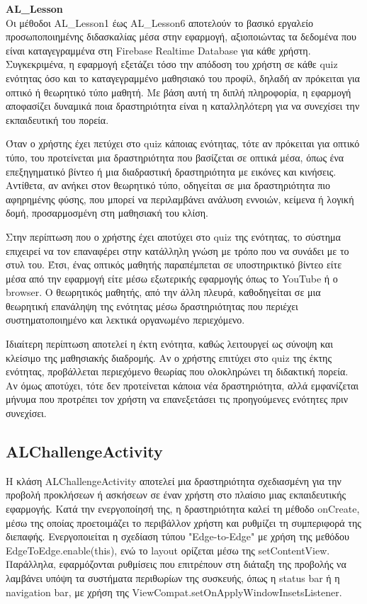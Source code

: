 \documentclass[11pt]{report}
\begin{document}
\vspace{0.3cm}
\textbf{AL\_Lesson} \\

Οι μέθοδοι AL\_Lesson1 έως AL\_Lesson6 αποτελούν το βασικό εργαλείο προσωποποιημένης διδασκαλίας μέσα στην εφαρμογή, αξιοποιώντας τα δεδομένα που είναι καταγεγραμμένα στη Firebase Realtime Database για κάθε χρήστη. Συγκεκριμένα, η εφαρμογή εξετάζει τόσο την απόδοση του χρήστη σε κάθε quiz ενότητας όσο και το καταγεγραμμένο μαθησιακό του προφίλ, δηλαδή αν πρόκειται για οπτικό ή θεωρητικό τύπο μαθητή. Με βάση αυτή τη διπλή πληροφορία, η εφαρμογή αποφασίζει δυναμικά ποια δραστηριότητα είναι η καταλληλότερη για να συνεχίσει την εκπαιδευτική του πορεία. 

Όταν ο χρήστης έχει πετύχει στο quiz κάποιας ενότητας, τότε αν πρόκειται για οπτικό τύπο, του προτείνεται μια δραστηριότητα που βασίζεται σε οπτικά μέσα, όπως ένα επεξηγηματικό βίντεο ή μια διαδραστική δραστηριότητα με εικόνες και κινήσεις. Αντίθετα, αν ανήκει στον θεωρητικό τύπο, οδηγείται σε μια δραστηριότητα πιο αφηρημένης φύσης, που μπορεί να περιλαμβάνει ανάλυση εννοιών, κείμενα ή λογική δομή, προσαρμοσμένη στη μαθησιακή του κλίση. 

Στην περίπτωση που ο χρήστης έχει αποτύχει στο quiz της ενότητας, το σύστημα επιχειρεί να τον επαναφέρει στην κατάλληλη γνώση με τρόπο που να συνάδει με το στυλ του. Έτσι, ένας οπτικός μαθητής παραπέμπεται σε υποστηρικτικό βίντεο είτε μέσα από την εφαρμογή είτε μέσω εξωτερικής εφαρμογής όπως το YouTube ή ο browser. Ο θεωρητικός μαθητής, από την άλλη πλευρά, καθοδηγείται σε μια θεωρητική επανάληψη της ενότητας μέσω δραστηριότητας που περιέχει συστηματοποιημένο και λεκτικά οργανωμένο περιεχόμενο. 

Ιδιαίτερη περίπτωση αποτελεί η έκτη ενότητα, καθώς λειτουργεί ως σύνοψη και κλείσιμο της μαθησιακής διαδρομής. Αν ο χρήστης επιτύχει στο quiz της έκτης ενότητας, προβάλλεται περιεχόμενο θεωρίας που ολοκληρώνει τη διδακτική πορεία. Αν όμως αποτύχει, τότε δεν προτείνεται κάποια νέα δραστηριότητα, αλλά εμφανίζεται μήνυμα που προτρέπει τον χρήστη να επανεξετάσει τις προηγούμενες ενότητες πριν συνεχίσει. 

\subsection{ALChallengeActivity}

Η κλάση ALChallengeActivity αποτελεί μια δραστηριότητα σχεδιασμένη για την προβολή προκλήσεων ή ασκήσεων σε έναν χρήστη στο πλαίσιο μιας εκπαιδευτικής εφαρμογής. Κατά την ενεργοποίησή της, η δραστηριότητα καλεί τη μέθοδο onCreate, μέσω της οποίας προετοιμάζει το περιβάλλον χρήστη και ρυθμίζει τη συμπεριφορά της διεπαφής. Ενεργοποιείται η σχεδίαση τύπου "Edge-to-Edge" με χρήση της μεθόδου EdgeToEdge.enable(this), ενώ το layout ορίζεται μέσω της setContentView. Παράλληλα, εφαρμόζονται ρυθμίσεις που επιτρέπουν στη διάταξη της προβολής να λαμβάνει υπόψη τα συστήματα περιθωρίων της συσκευής, όπως η status bar ή η navigation bar, με χρήση της ViewCompat.setOnApplyWindowInsetsListener. 
\end{document}
